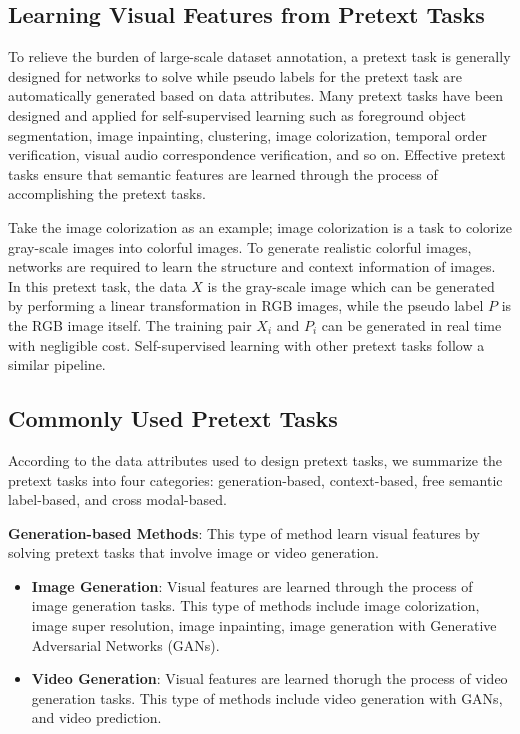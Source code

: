 \documentclass[conference]{IEEEtran}
\begin{document}
\subsection{Learning Visual Features from Pretext Tasks}
To relieve the burden of large-scale dataset annotation, a pretext task is generally designed for networks to solve while pseudo labels for the pretext task are automatically generated based on data attributes.
Many pretext tasks have been designed and applied for self-supervised learning such as foreground object segmentation, image inpainting, clustering, image colorization, temporal order verification, visual audio correspondence verification, and so on. 
Effective pretext tasks ensure that semantic features are learned through the process of accomplishing the pretext tasks.

Take the image colorization as an example; image colorization is a task to colorize gray-scale images into colorful images.
To generate realistic colorful images, networks are required to learn the structure and context information of images.
In this pretext task, the data $X$ is the gray-scale image which can be generated by performing a linear transformation in RGB images, while the pseudo label $P$ is the RGB image itself.
The training pair $X_i$ and $P_i$ can be generated in real time with negligible cost. Self-supervised learning with other pretext tasks follow a similar pipeline.

\subsection{Commonly Used Pretext Tasks}
According to the data attributes used to design pretext tasks, we summarize the pretext tasks into four categories: generation-based, context-based, free semantic label-based, and cross modal-based.

\textbf{Generation-based Methods}: This type of method learn visual features by solving pretext tasks that involve image or video generation.
\begin{itemize}
    \item \textbf{Image Generation}: Visual features are learned through the process of image generation tasks. This type of methods include image colorization, image super resolution, image inpainting, 
    image generation with Generative Adversarial Networks (GANs).
    \item \textbf{Video Generation}: Visual features are learned thorugh the process of video generation tasks. This type of methods include video generation with GANs, and video prediction.
\end{itemize}
\end{document}

